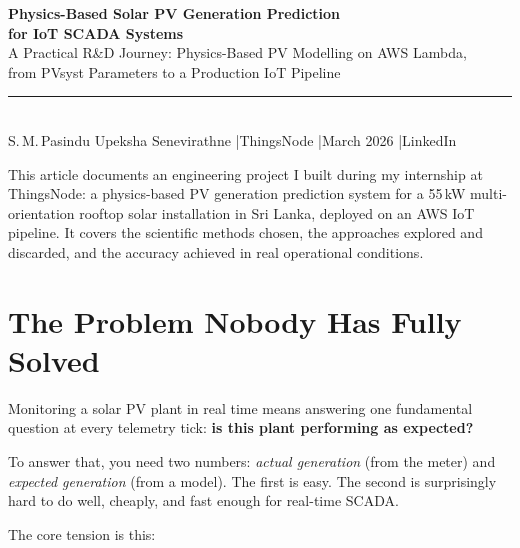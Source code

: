 \documentclass[11pt, a4paper]{article}
\newcommand{\highlight}[1]{\textbf{\color{brandblue}#1}}
\begin{document}
\begin{center}
  {\fontsize{22}{28}\selectfont\bfseries\color{darkgrey}
    Physics-Based Solar PV Generation Prediction\\[4pt]
    \color{brandblue}for IoT SCADA Systems}\\[10pt]
  {\large\color{lightgrey}
    A Practical R\&D Journey: Physics-Based PV Modelling on AWS Lambda,\\
    from PVsyst Parameters to a Production IoT Pipeline}\\[14pt]
  \rule{0.6\linewidth}{0.6pt}\\[8pt]
  {\small\color{lightgrey}
    S.\,M.\,Pasindu Upeksha Senevirathne \quad|\quad ThingsNode \quad|\quad March 2026 \quad|\quad LinkedIn}
\end{center}

\vspace{0.6em}

\begin{insightbox}
This article documents an engineering project I built during my internship
at ThingsNode: a physics-based PV generation prediction system for a 55\,kW
multi-orientation rooftop solar installation in Sri Lanka, deployed on an
AWS IoT pipeline. It covers the scientific methods chosen, the approaches
explored and discarded, and the accuracy achieved in real operational conditions.
\end{insightbox}

\vspace{0.5em}

\section{The Problem Nobody Has Fully Solved}

Monitoring a solar PV plant in real time means answering one fundamental
question at every telemetry tick: \highlight{is this plant performing as expected?}

To answer that, you need two numbers: \emph{actual generation} (from the meter)
and \emph{expected generation} (from a model). The first is easy. The second is
surprisingly hard to do well, cheaply, and fast enough for real-time SCADA.

The core tension is this:
\end{document}
